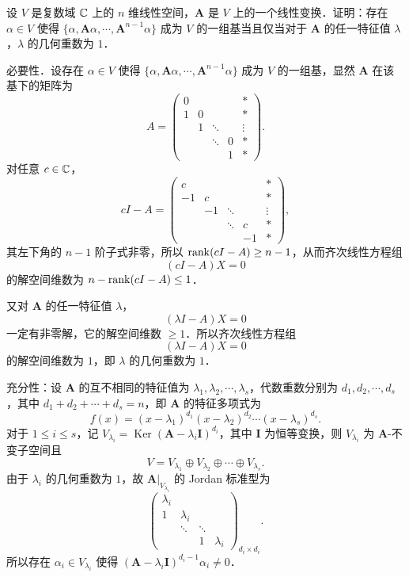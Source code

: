 设 $V$ 是复数域 $\mathbb{C}$ 上的 $n$ 维线性空间，$\bm{A}$ 是 $V$ 上的一个线性变换．证明：存在 $\alpha\in V$ 使得 $\{\alpha,\bm{A}\alpha,\cdots,\bm{A}^{n-1}\alpha\}$ 成为 $V$ 的一组基当且仅当对于 $\bm{A}$ 的任一特征值 $\lambda$，$\lambda$ 的几何重数为 $1$．
\begin{solution}
必要性．设存在 $\alpha\in V$ 使得 $\{\alpha,\bm{A}\alpha,\cdots,\bm{A}^{n-1}\alpha\}$ 成为 $V$ 的一组基，显然 $\bm{A}$ 在该基下的矩阵为
\[
A=\begin{pmatrix}
0 & & & & *\\
1 & 0 & & & *\\
 & 1 & \ddots & & \vdots\\
 & & \ddots & 0 & *\\
 & & & 1 & *
\end{pmatrix}.
\]
对任意 $c\in\mathbb{C}$，
\[
cI-A=\begin{pmatrix}
c & & & & *\\
-1 & c & & & *\\
 & -1 & \ddots & & \vdots\\
 & & \ddots & c & *\\
 & & & -1 & *
\end{pmatrix},
\]
其左下角的 $n-1$ 阶子式非零，所以 $\operatorname{rank}(cI-A)\ge n-1$，从而齐次线性方程组
\[
(cI-A)X=0
\]
的解空间维数为 $n-\operatorname{rank}(cI-A)\le 1$．

又对 $\bm{A}$ 的任一特征值 $\lambda$，
\[
(\lambda I-A)X=0
\]
一定有非零解，它的解空间维数 $\ge 1$．所以齐次线性方程组
\[
(\lambda I-A)X=0
\]
的解空间维数为 $1$，即 $\lambda$ 的几何重数为 $1$．

充分性：设 $\bm{A}$ 的互不相同的特征值为 $\lambda_{1},\lambda_{2},\cdots,\lambda_{s}$，代数重数分别为 $d_{1},d_{2},\cdots,d_{s}$，其中 $d_{1}+d_{2}+\cdots+d_{s}=n$，即 $\bm{A}$ 的特征多项式为
\[
f(x)=(x-\lambda_{1})^{d_{1}}(x-\lambda_{2})^{d_{2}}\cdots(x-\lambda_{s})^{d_{s}}.
\]
对于 $1\le i\le s$，记 $V_{\lambda_{i}}=\operatorname{Ker}(\bm{A}-\lambda_{i}\bm{I})^{d_{i}}$，其中 $\bm{I}$ 为恒等变换，则 $V_{\lambda_{i}}$ 为 $\bm{A}$-不变子空间且
\[
V=V_{\lambda_{1}}\oplus V_{\lambda_{2}}\oplus\cdots\oplus V_{\lambda_{s}}.
\]
由于 $\lambda_{i}$ 的几何重数为 $1$，故 $\bm{A}|_{V_{\lambda_{i}}}$ 的 Jordan 标准型为
\[
\begin{pmatrix}
\lambda_{i} & & & \\
1 & \lambda_{i} & & \\
 & \ddots & \ddots & \\
 & & 1 & \lambda_{i}
\end{pmatrix}_{d_{i}\times d_{i}}.
\]
所以存在 $\alpha_{i}\in V_{\lambda_{i}}$ 使得 $(\bm{A}-\lambda_{i}\bm{I})^{d_{i}-1}\alpha_{i}\ne 0$．


\end{solution}
